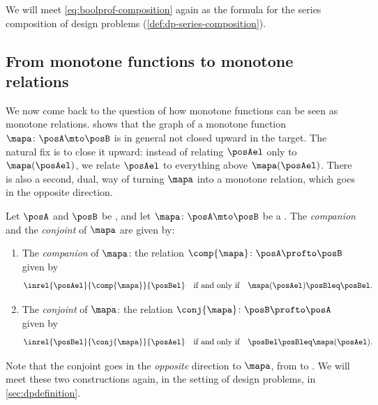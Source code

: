 We will meet \cref{eq:boolprof-composition} again as the formula for the series composition of design problems (\cref{def:dp-series-composition}).

\subsection{From monotone functions to monotone relations}
\label{sec:monrel-from-monotone-functions}

We now come back to the question of how monotone functions can be seen as monotone relations.
 shows that the graph of a monotone function $\mapa \colon \posA \mto \posB$ is in general not closed upward in the target.
The natural fix is to close it upward: instead of relating $\posAel$ only to $\mapa(\posAel)$, we relate $\posAel$ to everything above $\mapa(\posAel)$.
There is also a second, dual, way of turning $\mapa$ into a monotone relation, which goes in the opposite direction.

\begin{definition}
    \label{def:monrel-companion-conjoint}
    Let $\posA$ and $\posB$ be , and let $\mapa \colon \posA \mto \posB$ be a .
    The \emph{companion} and the \emph{conjoint} of $\mapa$ are given by:

    \constit
    \begin{enumerate}
        \item The \emph{companion} of $\mapa$: the relation $\comp{\mapa} \colon \posA \profto \posB$ given by
              \begin{equation}
                  \inrel{\posAel}{\comp{\mapa}}{\posBel}
                  \quad \text{if and only if} \quad
                  \mapa(\posAel) \posBleq \posBel.
              \end{equation}
        \item The \emph{conjoint} of $\mapa$: the relation $\conj{\mapa} \colon \posB \profto \posA$ given by
              \begin{equation}
                  \inrel{\posBel}{\conj{\mapa}}{\posAel}
                  \quad \text{if and only if} \quad
                  \posBel \posBleq \mapa(\posAel).
              \end{equation}
    \end{enumerate}
\end{definition}

Note that the conjoint goes in the \emph{opposite} direction to $\mapa$, from \posB to \posA.
We will meet these two constructions again, in the setting of design problems, in \cref{sec:dpdefinition}.

